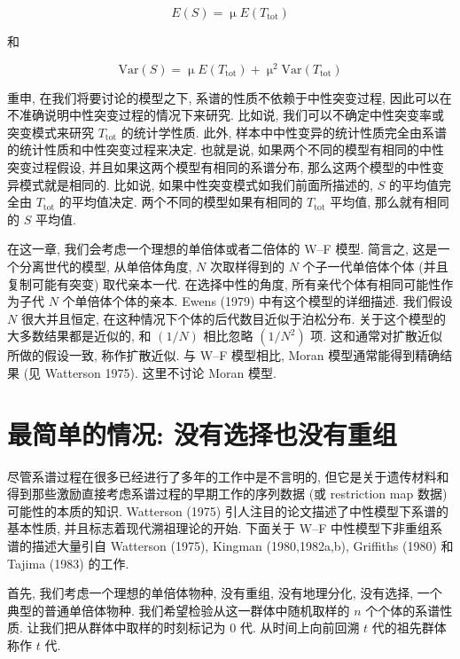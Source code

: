 \documentclass[
    12pt,%
    ]{article}
\begin{document}
\begin{equation} \label{eq:1}
    E(S) = \upmu E(T_{\text{tot}})
\end{equation}

和

\begin{equation} \label{eq:2}
    \text{Var}(S) = \upmu E(T_{\text{tot}}) + \upmu ^{2}\text{Var}(T_{\text{tot}})
\end{equation}

重申, 在我们将要讨论的模型之下, 系谱的性质不依赖于中性突变过程, 因此可以在不准确说明中性突变过程的情况下来研究. 比如说,
我们可以不确定中性突变率或突变模式来研究 $T_{\text{tot}}$ 的统计学性质. 此外,
样本中中性变异的统计性质完全由系谱的统计性质和中性突变过程来决定. 也就是说, 如果两个不同的模型有相同的中性突变过程假设,
并且如果这两个模型有相同的系谱分布, 那么这两个模型的中性变异模式就是相同的. 比如说, 如果中性突变模式如我们前面所描述的,
$S$ 的平均值完全由 $T_{\text{tot}}$ 的平均值决定. 两个不同的模型如果有相同的 $T_{\text{tot}}$ 平均值,
那么就有相同的 $S$ 平均值.

在这一章, 我们会考虑一个理想的单倍体或者二倍体的 W--F 模型. 简言之, 这是一个分离世代的模型, 从单倍体角度, $N$
次取样得到的 $N$ 个子一代单倍体个体 (并且复制可能有突变) 取代亲本一代. 在选择中性的角度, 所有亲代个体有相同可能性作为子代
$N$ 个单倍体个体的亲本. Ewens (1979) 中有这个模型的详细描述. 我们假设 $N$ 很大并且恒定,
在这种情况下个体的后代数目近似于泊松分布. 关于这个模型的大多数结果都是近似的, 和 $(1/N)$ 相比忽略 $(1/N^{2})$ 项.
这和通常对扩散近似所做的假设一致, 称作扩散近似. 与 W--F 模型相比, Moran 模型通常能得到精确结果 (见 Watterson 1975).
这里不讨论 Moran 模型.

\section{最简单的情况: 没有选择也没有重组}

尽管系谱过程在很多已经进行了多年的工作中是不言明的, 但它是关于遗传材料和得到那些激励直接考虑系谱过程的早期工作的序列数据 (或
restriction map 数据) 可能性的本质的知识. Watterson (1975) 引人注目的论文描述了中性模型下系谱的基本性质,
并且标志着现代溯祖理论的开始. 下面关于 W--F 中性模型下非重组系谱的描述大量引自 Watterson (1975), Kingman
(1980,1982a,b), Griffiths (1980) 和 Tajima (1983) 的工作.

首先, 我们考虑一个理想的单倍体物种, 没有重组, 没有地理分化, 没有选择, 一个典型的普通单倍体物种.
我们希望检验从这一群体中随机取样的 $n$ 个个体的系谱性质. 让我们把从群体中取样的时刻标记为 0 代. 从时间上向前回溯 $t$
代的祖先群体称作 $t$ 代.
\end{document}
